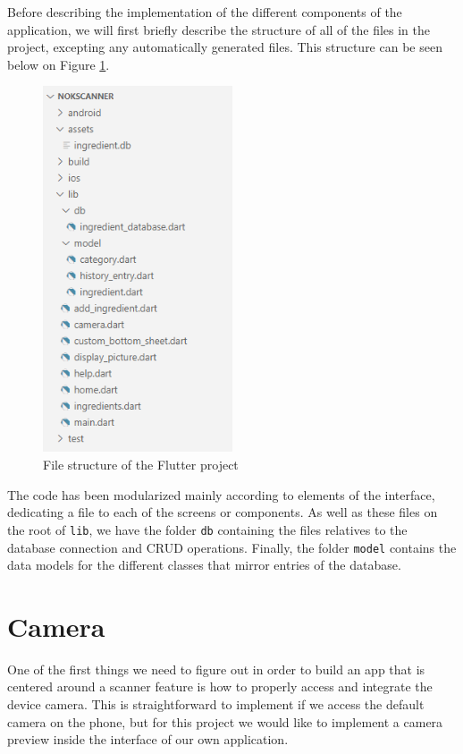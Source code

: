 Before describing the implementation of the different components of the application, we will first briefly describe the structure of all of the files in the project, excepting any automatically generated files. This structure can be seen below on Figure \ref{fig:file-structure}.

\begin{figure}[h]
  \centering
  \includegraphics[width=0.5\textwidth]{Figures/file_structure.png}
  \caption{
    File structure of the Flutter project
  }
  \label{fig:file-structure}
\end{figure}

The code has been modularized mainly according to elements of the interface, dedicating a file to each of the screens or components. As well as these files on the root of \texttt{lib}, we have the folder \texttt{db} containing the files relatives to the database connection and CRUD operations. Finally, the folder \texttt{model} contains the data models for the different classes that mirror entries of the database.

\section{Camera}

One of the first things we need to figure out in order to build an app that is centered around a scanner feature is how to properly access and integrate the device camera. This is straightforward to implement if we access the default camera on the phone, but for this project we would like to implement a camera preview inside the interface of our own application.

